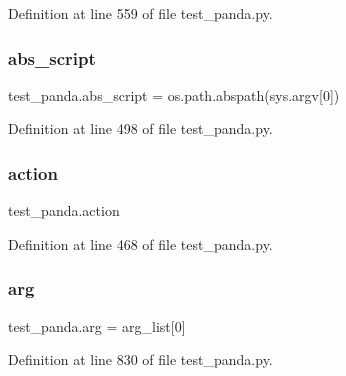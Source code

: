 Definition at line 559 of file test\+\_\+panda.\+py.

\mbox{\label{namespacetest__panda_af4105d119e28aa4a94138bf46ab86177}} 
\subsubsection{\texorpdfstring{abs\+\_\+script}{abs\_script}}
{\footnotesize\ttfamily test\+\_\+panda.\+abs\+\_\+script = os.\+path.\+abspath(sys.\+argv\mbox{[}0\mbox{]})}



Definition at line 498 of file test\+\_\+panda.\+py.

\mbox{\label{namespacetest__panda_a164944f1df8c7c37365132a9aef1facf}} 
\subsubsection{\texorpdfstring{action}{action}}
{\footnotesize\ttfamily test\+\_\+panda.\+action}



Definition at line 468 of file test\+\_\+panda.\+py.

\mbox{\label{namespacetest__panda_a1978491117258030555828342729e788}} 
\subsubsection{\texorpdfstring{arg}{arg}}
{\footnotesize\ttfamily test\+\_\+panda.\+arg = arg\+\_\+list\mbox{[}0\mbox{]}}



Definition at line 830 of file test\+\_\+panda.\+py.



